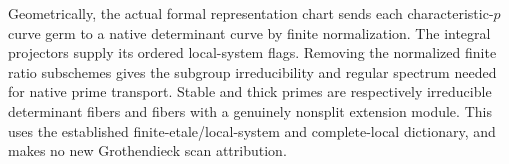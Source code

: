 Geometrically, the actual formal representation chart sends
each characteristic-\(p\) curve germ to a native determinant
curve by finite normalization.  The integral projectors supply
its ordered local-system flags.  Removing the normalized finite
ratio subschemes gives the subgroup irreducibility and regular
spectrum needed for native prime transport.  Stable and thick
primes are respectively irreducible determinant fibers and
fibers with a genuinely nonsplit extension module.  This uses
the established finite-etale/local-system and complete-local
dictionary, and makes no new Grothendieck scan attribution.
